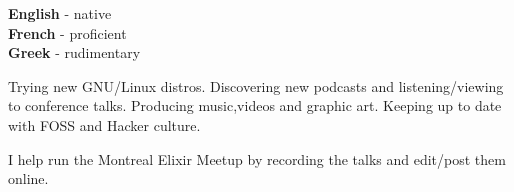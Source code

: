 \documentclass[9pt]{developercv} %
\begin{document}

\begin{minipage}[t]{0.3\textwidth}
	\vspace{-\baselineskip} %

	
	\textbf{English} - native\\
	\textbf{French} - proficient\\
	\textbf{Greek} - rudimentary
\end{minipage}
\hfill
\begin{minipage}[t]{0.3\textwidth}
	\vspace{-\baselineskip} %
	
	
  Trying new GNU/Linux distros.
  Discovering new podcasts and listening/viewing to conference talks.
  Producing music,videos and graphic art.
  Keeping up to date with FOSS and Hacker culture.
\end{minipage}
\hfill
\begin{minipage}[t]{0.3\textwidth}
	\vspace{-\baselineskip} %
	
	
	I help run the Montreal Elixir Meetup by recording the talks and edit/post them online.
\end{minipage}

\end{document}
